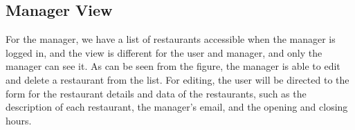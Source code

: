 \subsection{Manager View}


\begin{center}
    \label{fig:manager-ListOfRestaurants}
\end{center}

For the manager, we have a list of restaurants accessible when the manager is logged in, and the view is different for the user and manager, and only the manager can see it. As can be seen from the figure, the manager is able to edit and delete a restaurant from the list. For editing, the user will be directed to the form for the restaurant details and data of the restaurants, such as the description of each restaurant, the manager's email, and the opening and closing hours.



\begin{center}
    \label{fig:manager-ListOfRestaurants}
\end{center}

